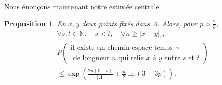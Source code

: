 \documentclass[titlepage,a4paper,12pt]{article}
\newcounter{d}
\newcounter{t}
\newcounter{p}
\newcounter{c}
\newcounter{a}
\newcounter{l}
\newtheorem{prop}[p]{Proposition}
\begin{document}
Nous énonçons maintenant notre estimée centrale.
\begin{prop} En 
$x,y$ deux points fixés dans $\Lambda$. Alors, pour $p>\frac{2}{3}$,
\begin{multline*}\forall s,t \in \mathbb{N}, \quad s<t, \quad \forall n \geqslant |x-y|_1,\\ P\left(\begin{array}{c}
\text{il existe un chemin espace-temps }\gamma\\ \text{ de longueur } n\text{ qui relie }x\text{ à }y \text{ entre }s\text{ et }t
\end{array}\right)\\  \leqslant \exp\left(\frac{2n(t-s)}{|\Lambda|}+\frac{n}{2}\ln(3-3p)\right).
\end{multline*}
\end{prop}
\end{document}
